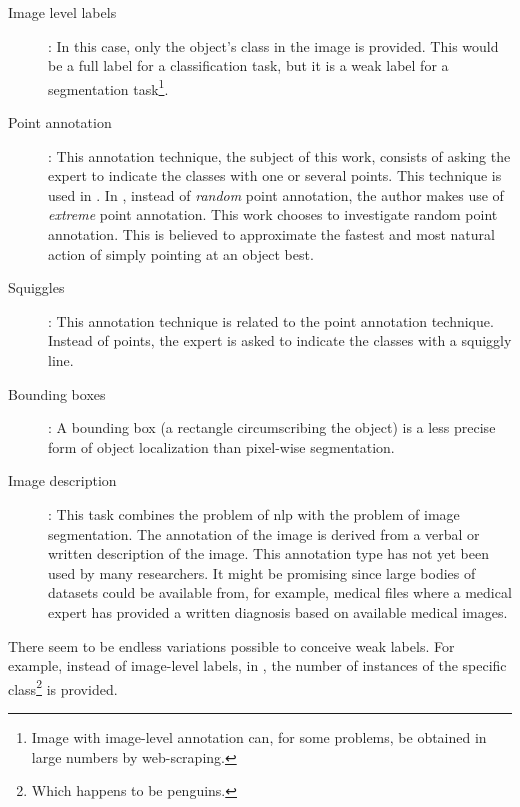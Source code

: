 \begin{description}
    \item[Image level labels]: In this case, only the object's class in the image is provided. 
    This would be a full label for a classification task, but it is a weak label for a segmentation task\footnote{Image with image-level annotation can, for some problems, be obtained in large numbers by web-scraping.}.
    \item[Point annotation]: This annotation technique, the subject of this work, consists of asking the expert to indicate the classes with one or several points. This technique is used in \cite{Laradji2020, Laradji2018, McEver2020}.
    In \cite{Maninis2018}, instead of \textit{random} point annotation, the author makes use of \textit{extreme} point annotation. This work chooses to investigate random point annotation.
    This is believed to approximate the fastest and most natural action of simply pointing at an object best.
    \item[Squiggles]: This annotation technique is related to the point annotation technique. Instead of points, the expert is asked to indicate the classes with a squiggly line.
    \item[Bounding boxes]: A bounding box (a rectangle circumscribing the object) is a less precise form of object localization than pixel-wise segmentation.
    \item[Image description]: This task combines the problem of \acrlong{nlp} with the problem of image segmentation. The annotation of the image is derived from a verbal or written description of the image. 
    This annotation type has not yet been used by many researchers. 
    It might be promising since large bodies of datasets could be available from, for example, medical files where a medical expert has provided a written diagnosis based on available medical images. 
\end{description}
\par{
    There seem to be endless variations possible to conceive weak labels. 
    For example, instead of image-level labels, in \cite{Laradji2018}, the number of instances of the specific class\footnote{Which happens to be penguins.} is provided. 
}
